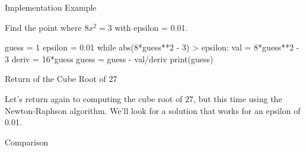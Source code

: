 \documentclass[pdf, aspectratio=169, 12pt]{beamer}
\begin{document}
\begin{frame}[fragile]{Implementation Example}
	\begin{example}
		Find the point where $8x^2 = 3$ with epsilon = 0.01.
	\end{example}
	\pause

	\begin{pythoncode}
		guess = 1
		epsilon = 0.01
		while abs(8*guess**2 - 3) > epsilon:
			val = 8*guess**2 - 3
			deriv = 16*guess
			guess = guess - val/deriv
		print(guess)
	\end{pythoncode}
\end{frame}

\begin{frame}[fragile]{Return of the Cube Root of 27}
	\begin{example}
		Let's return again to computing the cube root of 27, but this time using the Newton-Raphson algorithm. We'll look for a solution that works for an epsilon of 0.01.
	\end{example}
\end{frame}

\begin{frame}{Comparison}
	\begin{center}
	\end{center}
\end{frame}
\end{document}
